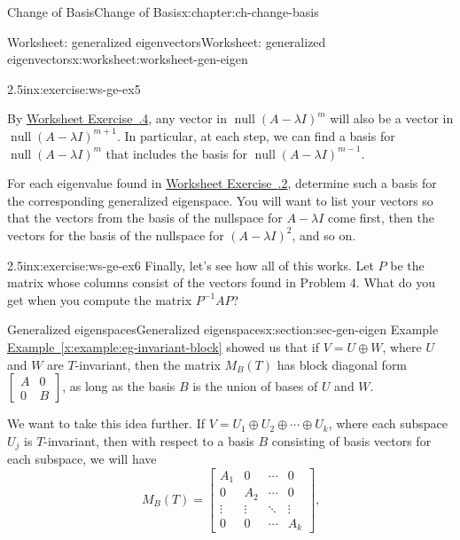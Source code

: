 \documentclass[oneside,10pt,]{book}
\newcommand{\xreffont}{\relax}
\numberwithin{equation}{section}
\newcommand{\bbm}{\begin{bmatrix}}
\newcommand{\ebm}{\end{bmatrix}}
\newcommand{\amp}{&}
\begin{document}
\begin{chapterptx}{Change of Basis}{}{Change of Basis}{}{}{x:chapter:ch-change-basis}
\begin{worksheet-section}{Worksheet: generalized eigenvectors}{}{Worksheet: generalized eigenvectors}{}{}{x:worksheet:worksheet-gen-eigen}
\begin{divisionexercise}{5}{}{2.5in}{x:exercise:ws-ge-ex5}
\par
By \hyperlink{x:exercise:ws-ge-ex4}{Worksheet Exercise~{\xreffont 5.4.4}}, any vector in \(\operatorname{null}(A-\lambda I)^m\) will also be a vector in \(\operatorname{null}(A-\lambda I)^{m+1}\). In particular, at each step, we can find a basis for \(\operatorname{null}(A-\lambda I)^m\) that includes the basis for \(\operatorname{null}(A-\lambda I)^{m-1}\).%
\par
For each eigenvalue found in \hyperlink{x:exercise:ws-ge-ex2}{Worksheet Exercise~{\xreffont 5.4.2}}, determine such a basis for the corresponding generalized eigenspace. You will want to list your vectors so that the vectors from the basis of the nullspace for \(A-\lambda I\) come first, then the vectors for the basis of the nullspace for \((A-\lambda I)^2\), and so on.%
\end{divisionexercise}%
\begin{divisionexercise}{6}{}{2.5in}{x:exercise:ws-ge-ex6}%
Finally, let's see how all of this works. Let \(P\) be the matrix whose columns consist of the vectors found in Problem 4. What do you get when you compute the matrix \(P^{-1}AP\)?%
\end{divisionexercise}%
\end{worksheet-section}
\restoregeometry
%
%
\typeout{************************************************}
\typeout{************************************************}
%
\begin{sectionptx}{Generalized eigenspaces}{}{Generalized eigenspaces}{}{}{x:section:sec-gen-eigen}
Example \hyperref[x:example:eg-invariant-block]{Example~{\xreffont\ref{x:example:eg-invariant-block}}} showed us that if \(V=U\oplus W\), where \(U\) and \(W\) are \(T\)-invariant, then the matrix \(M_B(T)\) has block diagonal form \(\bbm A \amp 0\\0\amp B\ebm\), as long as the basis \(B\) is the union of bases of \(U\) and \(W\).%
\par
We want to take this idea further. If \(V = U_1\oplus U_2\oplus \cdots \oplus U_k\), where each subspace \(U_j\) is \(T\)-invariant, then with respect to a basis \(B\) consisting of basis vectors for each subspace, we will have%
\begin{equation*}
M_B(T)=\bbm A_1 \amp 0 \amp \cdots \amp 0\\
0 \amp A_2 \amp \cdots \amp 0\\
\vdots \amp \vdots \amp \ddots \amp \vdots\\
0 \amp 0 \amp \cdots \amp A_k\ebm\text{,}

\end{equation*}
\end{sectionptx}
\end{chapterptx}
\end{document}
